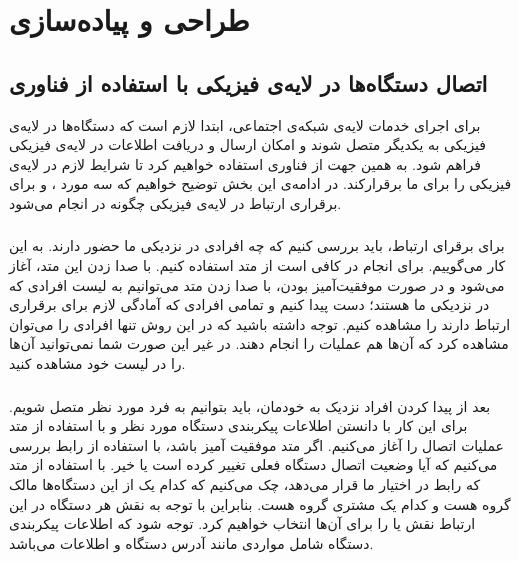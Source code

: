 \chapter{طراحی و پیاده‌سازی}
\thispagestyle{empty}
\section{اتصال دستگاه‌ها  در لایه‌ی فیزیکی با استفاده از فناوری }

برای اجرای خدمات لایه‌ی شبکه‌ی اجتماعی، ابتدا لازم است که دستگاه‌ها در لایه‌ی فیزیکی به یکدیگر متصل شوند و امکان ارسال و دریافت اطلاعات در لایه‌ی فیزیکی فراهم شود. به همین جهت از فناوری 
استفاده خواهیم کرد تا شرایط لازم در لایه‌ی فیزیکی را برای ما برقرار‌کند. در ادامه‌ی این بخش توضیح خواهیم که سه مورد 
،
و
برای برقراری ارتباط در لایه‌ی فیزیکی چگونه در
 انجام می‌شود.
\subsection{}
 برای برقرای ارتباط، باید بررسی کنیم که چه افرادی در نزدیکی ما حضور دارند. به این کار
  می‌گوییم. برای انجام 
در 
کافی است از متد
استفاده کنیم. با صدا زدن این متد،
آغاز می‌شود و در صورت موفقیت‌آمیز بودن، با صدا زدن متد
می‌توانیم به لیست افرادی که در نزدیکی ما هستند؛ دست پیدا کنیم و تمامی افرادی که آمادگی لازم برای برقراری ارتباط دارند را مشاهده کنیم. توجه داشته باشید که در این روش تنها افرادی را می‌توان مشاهده کرد که آن‌ها هم عملیات 
را انجام دهند. در غیر این صورت شما نمی‌توانید آن‌ها را در لیست خود مشاهده کنید.
\subsection{}
بعد از پیدا کردن افراد نزدیک به خودمان، باید بتوانیم به فرد مورد نظر متصل شویم. برای این کار با دانستن اطلاعات پیکربندی دستگاه مورد نظر و با استفاده از متد 
عملیات اتصال را آغاز می‌کنیم. اگر متد 
موفقیت آمیز باشد، با استفاده از رابط 
بررسی می‌کنیم که آیا وضعیت اتصال دستگاه فعلی تغییر کرده است یا خیر. با استفاده از متد 
که رابط 
 در اختیار ما قرار می‌دهد، چک می‌کنیم که کدام یک از این دستگاه‌ها مالک گروه هست و کدام یک مشتری گروه هست. بنابراین با توجه به نقش هر دستگاه در این ارتباط نقش  
یا 
را برای آن‌ها انتخاب خواهیم کرد.
توجه شود که اطلاعات پیکربندی دستگاه شامل مواردی مانند آدرس 
دستگاه و اطلاعات 
می‌باشد.
